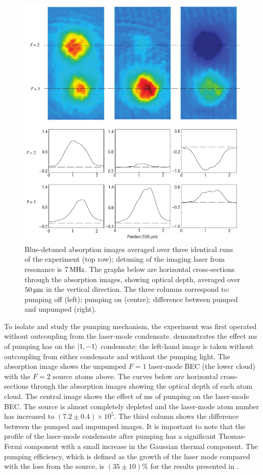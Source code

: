 \begin{figure}
    \centering
    \includegraphics[width=12cm]{ExperimentalResults}
    \caption{Blue-detuned absorption images averaged over three identical runs of the experiment (top row); detuning of the imaging laser from resonance is $\unit[7]{MHz}$.  The graphs below are horizontal cross-sections through the absorption images, showing optical depth, averaged over $\unit[50]{\micro m}$ in the vertical direction.  The three columns correspond to: pumping off (left); pumping on (centre); difference between pumped and unpumped (right).}
    \label{OpticalPumping:ExperimentalResults}
\end{figure}

To isolate and study the pumping mechanism, the experiment was first operated without outcoupling from the laser-mode condensate.   demonstrates the effect \unit[200]{ms} of pumping has on the ${\left|1, -1\right>}$ condensate; the left-hand image is taken without outcoupling from either condensate and without the pumping light.  The absorption image shows the unpumped $F=1$ laser-mode BEC (the lower cloud) with the $F=2$ source atoms above.  The curves below are horizontal cross-sections through the absorption images showing the optical depth of each atom cloud.  The central image shows the effect of \unit[200]{ms} of pumping on the laser-mode BEC.   The source is almost completely depleted and the laser-mode atom number has increased to $(7.2 \pm 0.4)\times 10^5$.  The third column shows the difference between the pumped and unpumped images. It is important to note that the profile of the laser-mode condensate after pumping has a significant Thomas-Fermi component with a small increase in the Gaussian thermal component.  The pumping efficiency, which is defined as the growth of the laser mode compared with the loss from the source, is $(35 \pm 10)\%$ for the results presented in .

